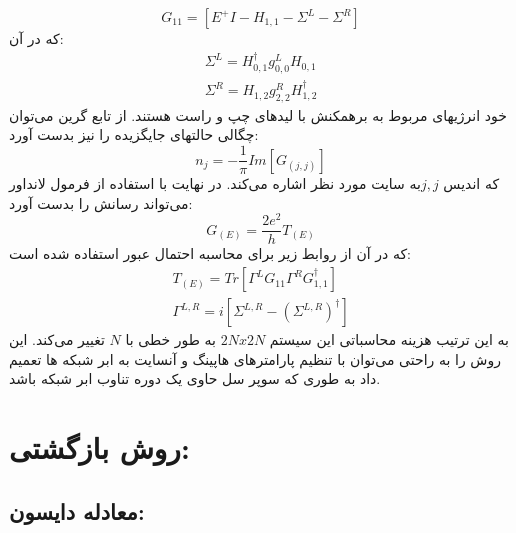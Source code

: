 \begin{equation}
    G_{11} = \left[E^+I- H_{1,1}- \Sigma^L-\Sigma^R\right]
\end{equation}
که در آن: 
\begin{equation}
    \begin{split}
        \Sigma^L = H^{\dagger}_{0,1} g^{L}_{0,0}H_{0,1}\\
        \Sigma^R = H_{1,2} g^{R}_{2,2}H^{\dagger}_{1,2}
    \end{split}
\end{equation}
خود انرژیهای مربوط به برهمکنش با لیدهای چپ و راست هستند. از تابع گرین می‌توان چگالی حالتهای جایگزیده  را نیز بدست آورد: 
\begin{equation}
    n_j = - \frac{1}{\pi} Im[G_{(j,j)}]
\end{equation}
که اندیس $j,j $به سایت مورد نظر اشاره می‌کند. در نهایت با استفاده از فرمول لانداور می‌تواند رسانش را بدست آورد:
\begin{equation}
    G_{(E)} = \frac{2e^2}{h} T_{(E)}
\end{equation}
که در آن از روابط زیر برای محاسبه احتمال عبور استفاده شده است: 
\begin{equation}
    \begin{split}
        T_{(E)} = Tr[\Gamma^{L}G_{11}\Gamma^{R}G^{\dagger}_{1,1}]\\
        \Gamma^{L,R} = i [\Sigma^{L,R}- (\Sigma^{L,R})^{\dagger}]
    \end{split}
\end{equation}
به این ترتیب هزینه محاسباتی این سیستم  $2N x 2N$ به طور خطی با $N$ تغییر می‌کند. این روش را به راحتی می‌توان با تنظیم پارامترهای هاپینگ و آنسایت به ابر شبکه ها تعمیم داد به طوری که سوپر سل حاوی یک دوره تناوب ابر شبکه باشد.
\section*{روش بازگشتی:}
\subsection*{معادله دایسون:}

